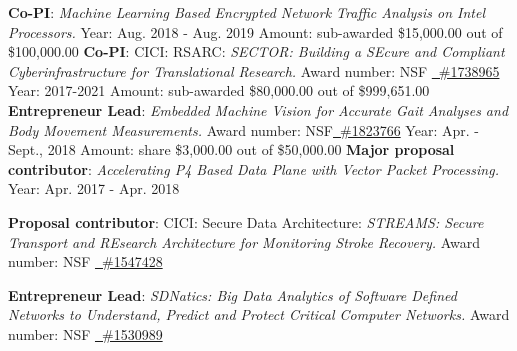 \documentclass[11pt]{moderncv}
\begin{document}
%
{\textbf{Co-PI}: \textit{Machine Learning Based Encrypted Network Traffic Analysis on Intel Processors.} \newline
Year: Aug. 2018 - Aug. 2019 \newline
Amount: sub-awarded \$15,000.00 out of \$100,000.00
}
%
{\textbf{Co-PI}: CICI: RSARC: \textit{SECTOR: Building a {SE}cure and Compliant {C}yberinfrastructure for {T}ranslati{o}nal {R}esearch.} \newline
	Award number: NSF \href{https://nsf.gov/awardsearch/showAward?AWD_ID=1738965}
	{\color{color2}\homepagesymbol~\#1738965} \newline
	Year: 2017-2021 \newline
	Amount:  sub-awarded \$80,000.00 out of \$999,651.00
}
%
{\textbf{Entrepreneur Lead}: \textit{Embedded Machine Vision for Accurate Gait Analyses and Body Movement Measurements.} \newline
Award number: NSF\href{https://nsf.gov/awardsearch/showAward?AWD_ID=1823766}
  {\color{color2}\homepagesymbol~\#1823766} \newline
Year: Apr. - Sept., 2018 \newline
Amount:  share \$3,000.00 out of \$50,000.00
}
%
{\textbf{Major proposal contributor}: \textit{Accelerating P4 Based Data Plane with Vector Packet Processing.} \newline
Year: Apr. 2017 - Apr. 2018
}

%
{\textbf{Proposal contributor}: CICI: Secure Data Architecture: \textit{STREAMS: Secure Transport and REsearch Architecture for Monitoring Stroke Recovery.} \newline
Award number: NSF \href{https://www.nsf.gov/awardsearch/showAward?AWD_ID=1547428}
  {\color{color2}\homepagesymbol~\#1547428} 
}

%
{\textbf{Entrepreneur Lead}: \textit{SDNatics: Big Data Analytics of Software Defined Networks to Understand, Predict and Protect Critical Computer Networks.} \newline
Award number: NSF \href{https://www.nsf.gov/awardsearch/showAward?AWD_ID=1530989}
    {\color{color2}\homepagesymbol~\#1530989} \newline
}
\end{document}
